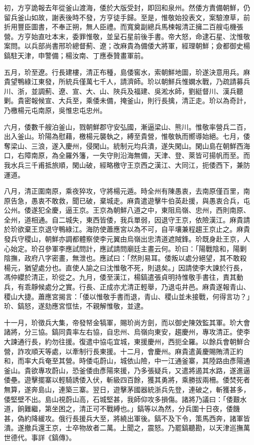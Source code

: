 \begin{pinyinscope}
初，方亨詭報去年從釜山渡海，倭於大版受封，即回和泉州。然倭方責備朝鮮，仍留兵釜山如故，謝表後時不發，方亨徒手歸。至是，惟敬始投表文，案驗潦草，前折用豐臣圖書，不奉正朔，無人臣禮。而寬奠副總兵馬楝報清正擁二百艘屯機張營。方亨始直吐本末，委罪惟敬，並呈石星前後手書。帝大怒，命逮石星、沈惟敬案問。以兵部尚書邢玠總督薊、遼；改麻貴為備倭大將軍，經理朝鮮；僉都御史楊鎬駐天津，申警備；楊汝南、丁應泰贊畫軍前。

五月，玠至遼。行長建樓，清正布種，島倭窖水，索朝鮮地圖，玠遂決意用兵。麻貴望鴨綠江東發，所統兵僅萬七千人，請濟師。玠以朝鮮兵惟嫻水戰，乃疏請募兵川、浙，並調薊、遼、宣、大、山、陜兵及福建、吳淞水師，劉綎督川、漢兵聽剿。貴密報候宣、大兵至，乘倭未備，掩釜山，則行長擒，清正走。玠以為奇計，乃檄楊元屯南原，吳惟忠屯忠州。

六月，倭數千艘泊釜山，戮朝鮮郡守安弘國，漸逼梁山、熊川。惟敬率營兵二百，出入釜山。玠陽為慰藉，檄楊元襲執之，縛至貴營，惟敬執而嚮導始絕。七月，倭奪梁山、三浪，遂入慶州，侵閑山。統制元均兵潰，遂失閑山。閑山島在朝鮮西海口，右障南原，為全羅外籓，一失守則沿海無備，天津、登、萊皆可揚帆而至。而我水兵三千甫抵旅順，閑山破，經略檄守王京西之漢江、大同江，扼倭西下，兼防運道。

八月，清正圍南原，乘夜猝攻，守將楊元遁。時全州有陳愚衷，去南原僅百里，南原告急，愚衷不敢救，聞已破，棄城走。麻貴遣遊擊牛伯英赴援，與愚衷合兵，屯公州。倭遂犯全慶，逼王京。王京為朝鮮八道之中，東阻烏嶺、忠州，西則南原、全州，道相通。自二城失，東西皆倭，我兵單弱，因退守王京，依險漢江。麻貴請於玠欲棄王京退守鴨綠江。海防使蕭應宮以為不可，自平壤兼程趨王京止之。麻貴發兵守稷山，朝鮮亦調都體察使李元翼由烏嶺出忠清道遮賊鋒。玠既身赴王京，人心始定。玠召參軍李應試問計，應試請問廟廷主畫云何。玠曰：「陽戰陰和，陽剿陰撫，政府八字密畫，無泄也。應試曰：「然則易耳。倭叛以處分絕望，其不敢殺楊元，猶望處分也。直使人諭之曰沈惟敬不死，則退矣。」因請使李大諫於行長，馮仲纓於清正，玠從之。九月，倭至漢江，楊鎬遣張貞明持惟敬手書往，責其動兵，有乖靜候處分之實。行長、正成亦尤清正輕舉，乃退屯井邑。麻貴遂報青山、稷山大捷。蕭應宮揭言：「倭以惟敬手書而退，青山、稷山並未接戰，何得言功？」玠、鎬怒，遂劾應宮恇怯，不親解惟敬，並逮。

十一月，玠徵兵大集，帝發帑金犒軍，賜玠尚方劍，而以御史陳效監其軍。玠大會諸將，分三協。鎬同貴率左右協，自忠州、烏嶺向東安，趨慶州，專攻清正。使李大諫通行長，約勿往援。復遣中協屯宜城，東援慶州，西扼全羅。以餘兵會朝鮮合營，詐攻順天等處，以牽制行長東援。十二月，會慶州。麻貴遣黃慶賜賄清正約和，而率大兵奄至其營。時倭屯蔚山，城依山險，中一江通釜寨，其陸路由彥陽通釜山。貴欲專攻蔚山，恐釜倭由彥陽來援，乃多張疑兵，又遣將遏其水路，遂進逼倭壘。遊擊擺寨以輕騎誘倭入伏，斬級四百餘，獲其勇將，乘勝拔兩柵。倭焚死者無算，遂奔島山，連築三寨。翌日，遊擊茅國器統浙兵先登，連破之，斬獲甚多，倭堅壁不出。島山視蔚山高，石城堅甚，我師仰攻多損傷。諸將乃議曰：「倭艱水道，餉難繼，第坐困之，清正可不戰縛也。」鎬等以為然，分兵圍十日夜，倭饑甚，偽約降緩攻。俄行長援兵大至，將繞出軍後。鎬不及下令，策馬西奔，諸軍皆潰。遂撤兵還王京，士卒物故者二萬。上聞之，震怒。乃罷鎬聽勘，以天津巡撫萬世德代。事詳《鎬傳》。


\end{pinyinscope}
